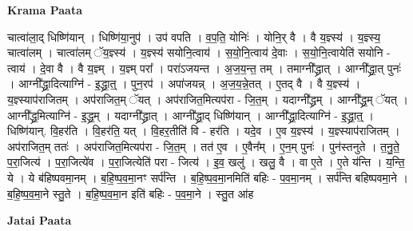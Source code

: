\documentclass[17pt]{extarticle}
\begin{document}
\textbf{Krama Paata} \newline

चात्वा॑ला॒द् धिष्णि॑यान् । धिष्णि॑या॒नुप॑ । उप॑ वपति । व॒प॒ति॒ योनिः॑ । योनि॒र् वै । वै य॒ज्ञ्स्य॑ । य॒ज्ञ्स्य॒ चात्वा॑लम् । चात्वा॑लम् ॅय॒ज्ञ्स्य॑ । य॒ज्ञ्स्य॑ सयोनि॒त्वाय॑ । स॒यो॒नि॒त्वाय॑ दे॒वाः । स॒यो॒नि॒त्वायेति॑ सयोनि - त्वाय॑ । दे॒वा वै । वै य॒ज्ञ्म् । य॒ज्ञ्म् परा᳚ । परा॑ऽजयन्त । अ॒ज॒य॒न्त॒ तम् । तमाग्नी᳚द्ध्रात् । आग्नी᳚द्ध्रा॒त् पुनः॑ । आग्नी᳚द्ध्रा॒दित्याग्नि॑ - इ॒द्ध्रा॒त्॒ । पुन॒रप॑ । अपा॑जयन्न् । अ॒ज॒य॒न्ने॒तत् । ए॒तद् वै । वै य॒ज्ञ्स्य॑ । य॒ज्ञ्स्याप॑राजितम् । अप॑राजित॒म् ॅयत् । अप॑राजित॒मित्यप॑रा - जि॒त॒म् । यदाग्नी᳚द्ध्रम् । आग्नी᳚द्ध्र॒म् ॅयत् । आग्नी᳚द्ध्र॒मित्याग्नि॑ - इ॒द्ध्र॒म् । यदाग्नी᳚द्ध्रात् । आग्नी᳚द्ध्रा॒द् धिष्णि॑यान् । आग्नी᳚द्ध्रा॒दित्याग्नि॑ - इ॒द्ध्रा॒त्॒ । धिष्णि॑यान्. वि॒हर॑ति । वि॒हर॑ति॒ यत् । वि॒हर॒तीति॑ वि - हर॑ति । यदे॒व । ए॒व य॒ज्ञ्स्य॑ । य॒ज्ञ्स्याप॑राजितम् । अप॑राजित॒म् ततः॑ । अप॑राजित॒मित्यप॑रा - जि॒त॒म् । तत॑ ए॒व । ए॒वैन᳚म् । ए॒न॒म् पुनः॑ । पुन॑स्तनुते । त॒नु॒ते॒ प॒रा॒जित्य॑ । प॒रा॒जित्ये॑व । प॒रा॒जित्येति॑ परा - जित्य॑ । इ॒व॒ खलु॑ । खलु॒ वै । वा ए॒ते । ए॒ते य॑न्ति । य॒न्ति॒ ये । ये ब॑हिष्पवमा॒नम् । ब॒हि॒ष्प॒व॒मा॒नꣳ सर्प॑न्ति । ब॒हि॒ष्प॒व॒मा॒नमिति॑ बहिः - प॒व॒मा॒नम् । सर्प॑न्ति बहिष्पवमा॒ने । ब॒हि॒ष्प॒व॒मा॒ने स्तु॒ते । ब॒हि॒ष्प॒व॒मा॒न इति॑ बहिः - प॒व॒मा॒ने । स्तु॒त आ॑ह \newline

\textbf{Jatai Paata} \newline
\end{document}
